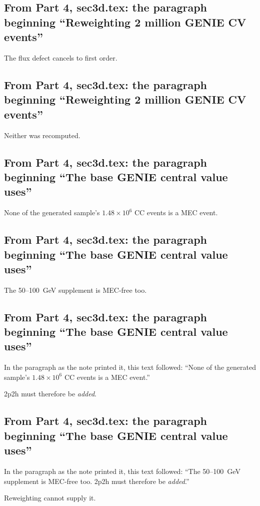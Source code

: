 \subsection{From Part 4, sec3d.tex: the paragraph beginning ``Reweighting 2 million GENIE CV events''}
The flux defect cancels to first order.

\subsection{From Part 4, sec3d.tex: the paragraph beginning ``Reweighting 2 million GENIE CV events''}
Neither was recomputed.

\subsection{From Part 4, sec3d.tex: the paragraph beginning ``The base GENIE central value uses''}
None of the generated sample's $1.48\times10^{6}$ CC events is a MEC event.

\subsection{From Part 4, sec3d.tex: the paragraph beginning ``The base GENIE central value uses''}
The 50--\SI{100}{GeV} supplement is MEC-free too.

\subsection{From Part 4, sec3d.tex: the paragraph beginning ``The base GENIE central value uses''}
In the paragraph as the note printed it, this text followed: ``None of the generated sample's $1.48\times10^{6}$ CC events is a MEC event.''\par
2p2h must therefore be \emph{added}.

\subsection{From Part 4, sec3d.tex: the paragraph beginning ``The base GENIE central value uses''}
In the paragraph as the note printed it, this text followed: ``The 50--\SI{100}{GeV} supplement is MEC-free too. 2p2h must therefore be \emph{added}.''\par
Reweighting cannot supply it.


